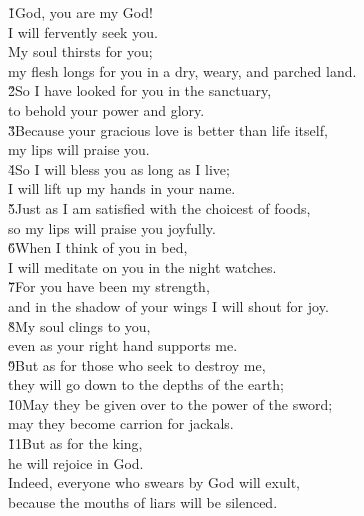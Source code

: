 \begin{poetry}
\poeml \v{1}God, you are my God! \\
\poemll    I will fervently seek you. \\
\poeml My soul thirsts for you; \\
\poemll    my flesh longs for you in a dry, weary, and parched land. \\
\poeml \v{2}So I have looked for you in the sanctuary, \\
\poemll    to behold your power and glory. \\
\poeml \v{3}Because your gracious love is better than life itself, \\
\poemll    my lips will praise you. \\
\poeml \v{4}So I will bless you as long as I live; \\
\poemll    I will lift up my hands in your name. \\
\poeml \v{5}Just as I am satisfied with the choicest of foods, \\
\poemll    so my lips will praise you joyfully. \\
\poeml \v{6}When I think of you in bed, \\
\poemll    I will meditate on you in the night watches. \\
\poeml \v{7}For you have been my strength, \\
\poemll    and in the shadow of your wings I will shout for joy. \\
\poeml \v{8}My soul clings to you, \\
\poemll    even as your right hand supports me. \\
\poeml \v{9}But as for those who seek to destroy me, \\
\poemll    they will go down to the depths of the earth; \\
\poeml \v{10}May they be given over to the power of the sword; \\
\poemll    may they become carrion for jackals. \\
\poeml \v{11}But as for the king, \\
\poemll    he will rejoice in God. \\
\poeml Indeed, everyone who swears by God will exult, \\
\poemll    because the mouths of liars will be silenced.
\end{poetry}

